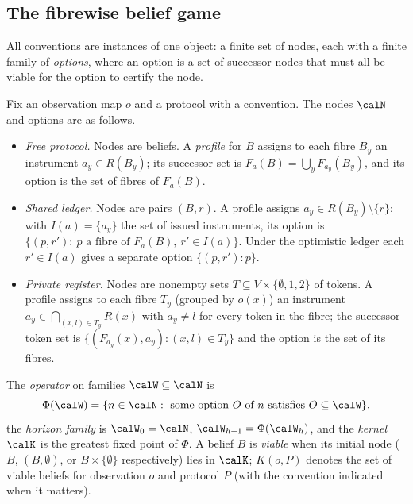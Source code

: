 \subsection{The fibrewise belief game}\label{sec:game}

All conventions are instances of one object: a finite set of nodes, each with a finite family of \emph{options}, where an option is a set of successor nodes that must all be viable for the option to certify the node.

\begin{definition}\label{def:game}
Fix an observation map $o$ and a protocol with a convention. The nodes $\calN$ and options are as follows.
\begin{itemize}[leftmargin=2em,itemsep=1pt]
\item \emph{Free protocol.} Nodes are beliefs. A \emph{profile} for $B$ assigns to each fibre $B_y$ an instrument $a_y\in R(B_y)$; its successor set is $F_a(B)=\bigcup_y F_{a_y}(B_y)$, and its option is the set of fibres of $F_a(B)$.
\item \emph{Shared ledger.} Nodes are pairs $(B,r)$. A profile assigns $a_y\in R(B_y)\setminus\{r\}$; with $I(a)=\{a_y\}$ the set of issued instruments, its option is $\{(p,r'):\ p \text{ a fibre of } F_a(B),\ r'\in I(a)\}$. Under the optimistic ledger each $r'\in I(a)$ gives a separate option $\{(p,r'): p\}$.
\item \emph{Private register.} Nodes are nonempty sets $T\subseteq V\times\{\emptyset,1,2\}$ of tokens. A profile assigns to each fibre $T_y$ (grouped by $o(x)$) an instrument $a_y\in\bigcap_{(x,l)\in T_y}R(x)$ with $a_y\neq l$ for every token in the fibre; the successor token set is $\{(F_{a_y}(x),a_y):(x,l)\in T_y\}$ and the option is the set of its fibres.
\end{itemize}
The \emph{operator} on families $\calW\subseteq\calN$ is
\begin{equation}\label{eq:Phi}
\Phi(\calW)=\{n\in\calN:\ \text{some option } O \text{ of } n \text{ satisfies } O\subseteq\calW\},
\end{equation}
the \emph{horizon family} is $\calW_0=\calN$, $\calW_{h+1}=\Phi(\calW_h)$, and the \emph{kernel} $\calK$ is the greatest fixed point of $\Phi$. A belief $B$ is \emph{viable} when its initial node ($B$, $(B,\emptyset)$, or $B\times\{\emptyset\}$ respectively) lies in $\calK$; $K(o,P)$ denotes the set of viable beliefs for observation $o$ and protocol $P$ (with the convention indicated when it matters).
\end{definition}

